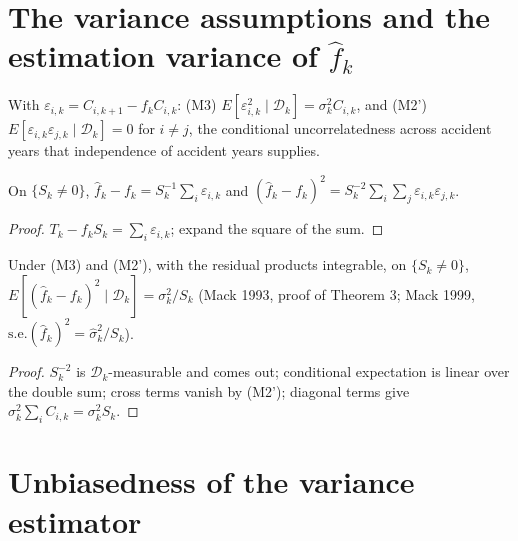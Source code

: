 \section{The variance assumptions and the estimation variance of $\hat f_k$}

\begin{definition}\label{def:Mack3}\leanok
{}
With $\varepsilon_{i,k} = C_{i,k+1} - f_k C_{i,k}$: (M3) $E[\varepsilon_{i,k}^2 \mid \mathcal{D}_k] = \sigma_k^2 C_{i,k}$,
and (M2') $E[\varepsilon_{i,k}\varepsilon_{j,k} \mid \mathcal{D}_k] = 0$ for $i \neq j$, the
conditional uncorrelatedness across accident years that independence of accident years supplies.
\end{definition}

\begin{lemma}\label{lem:fhat_sub}\leanok
{}
On $\{S_k \neq 0\}$, $\hat f_k - f_k = S_k^{-1}\sum_i \varepsilon_{i,k}$ and
$(\hat f_k - f_k)^2 = S_k^{-2}\sum_i\sum_j \varepsilon_{i,k}\varepsilon_{j,k}$.
\end{lemma}
\begin{proof}\leanok $T_k - f_k S_k = \sum_i \varepsilon_{i,k}$; expand the square of the sum. \end{proof}

\begin{theorem}\label{thm:var_fhat}\leanok
{}
Under (M3) and (M2'), with the residual products integrable, on $\{S_k \neq 0\}$,
$E[(\hat f_k - f_k)^2 \mid \mathcal{D}_k] = \sigma_k^2 / S_k$
(Mack 1993, proof of Theorem 3; Mack 1999, $\mathrm{s.e.}(\hat f_k)^2 = \hat\sigma_k^2/S_k$).
\end{theorem}
\begin{proof}\leanok
$S_k^{-2}$ is $\mathcal{D}_k$-measurable and comes out; conditional expectation is linear over the
double sum; cross terms vanish by (M2'); diagonal terms give $\sigma_k^2\sum_i C_{i,k} = \sigma_k^2 S_k$.
\end{proof}

\section{Unbiasedness of the variance estimator}

